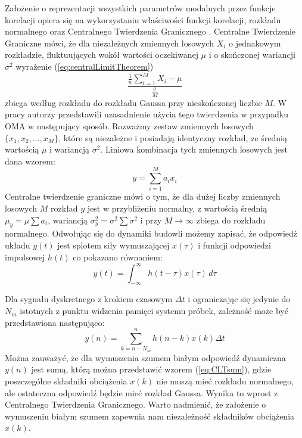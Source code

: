 Założenie o reprezentacji wszystkich parametrów modalnych przez funkcje korelacji opiera się na wykorzystaniu właściwości funkcji korelacji, rozkładu normalnego oraz Centralnego Twierdzenia Granicznego . Centralne Twierdzenie Graniczne mówi, że dla niezależnych zmiennych losowych $X_i$ o jednakowym rozkładzie, fluktuujących wokół wartości oczekiwanej $\mu$ i o skończonej wariancji $\sigma^2$ wyrażenie (\ref{eq:centralLimitTheorem})
\begin{equation} \label{eq:centralLimitTheorem}
	\frac{\frac{1}{n}\sum_{i=1}^{M} X_i - \mu}{\frac{\sigma}{M}}
\end{equation}
zbiega według rozkładu do rozkładu Gaussa przy nieskończonej liczbie $M$.
W pracy \cite{Brincker2015} autorzy przedstawili uzasadnienie użycia tego twierdzenia w przypadku OMA w następujący sposób. Rozważmy zestaw zmiennych losowych $\{x_1,x_2,...,x_M\}$, które są niezależne i posiadają identyczny rozkład, ze średnią wartością $\mu$ i wariancją $\sigma^2$. Liniowa kombinacja tych zmiennych losowych jest dana wzorem:
\begin{equation} \label{eq:CLTsum}
	y = \sum_{i=1}^{M} a_i x_i
\end{equation}
Centralne twierdzenie graniczne mówi o tym, że dla dużej liczby zmiennych losowych $M$ rozkład $y$ jest w przybliżeniu normalny, z wartością średnią $\mu_y=\mu\sum a_i$, wariancją $\sigma_y^2=\sigma^2\sum \sigma^2$ i przy $M \xrightarrow{} \infty$ zbiega do rozkładu normalnego. Odwołując się do dynamiki budowli możemy zapisać, że odpowiedź układu $y(t)$ jest splotem siły wymuszającej $x(\tau)$ i funkcji odpowiedzi impulsowej $h(t)$ co pokazano równaniem:
\begin{equation} \label{eq:convolutionResponse}
	y(t)=\int_{-\infty}^{\infty}h(t-\tau)x(\tau) \,d\tau
\end{equation}

Dla sygnału dyskretnego z krokiem czasowym $\Delta t$ i ograniczając się jedynie do $N_m$ istotnych z punktu widzenia pamięci systemu próbek, zależność może być przedstawiona następująco:
\begin{equation}
	y(n) = \sum_{k=n-N_m}^{n} h(n-k)x(k)\Delta t
\end{equation}
Można zauważyć, że dla wymuszenia szumem białym odpowiedź dynamiczna $y(n)$ jest sumą, którą można przedstawić wzorem (\ref{eq:CLTsum}), gdzie poszczególne składniki obciążenia $x(k)$ nie muszą mieć rozkładu normalnego, ale ostateczna odpowiedź będzie mieć rozkład Gaussa. Wynika to wprost z Centralnego Twierdzenia Granicznego. Warto nadmienić, że założenie o wymuszeniu białym szumem zapewnia nam niezależność składników obciążenia $x(k)$. 


